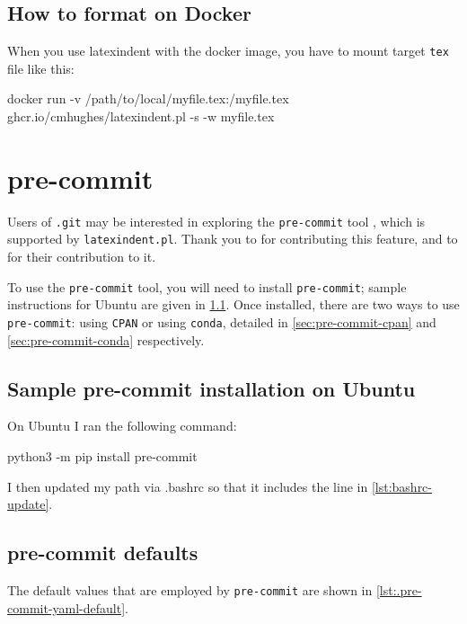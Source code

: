  \subsection{How to format on Docker}
   When you use latexindent with the docker image, you have to mount target \texttt{tex} file like this:
\begin{commandshell}
  docker run -v /path/to/local/myfile.tex:/myfile.tex ghcr.io/cmhughes/latexindent.pl -s -w myfile.tex
\end{commandshell}

\section{pre-commit}

  Users of \texttt{.git} may be interested  in exploring the \texttt{pre-commit} tool \cite{pre-commithome}, which is
  supported by \texttt{latexindent.pl}. Thank you to \cite{tdegeusprecommit} for
  contributing this feature, and to \cite{holzhausprecommit} for their contribution to it.

  To use the \texttt{pre-commit} tool, you will need to install \texttt{pre-commit}; sample
  instructions for Ubuntu are given in \cref{sec:pre-commit-ubuntu}. Once installed, there
  are two ways to use \texttt{pre-commit}: using \texttt{CPAN} or using \texttt{conda},
  detailed in \cref{sec:pre-commit-cpan} and \cref{sec:pre-commit-conda} respectively.

 \subsection{Sample pre-commit installation on Ubuntu}\label{sec:pre-commit-ubuntu}
  On Ubuntu I ran the following command:
  \begin{commandshell}
python3 -m pip install pre-commit
\end{commandshell}
  I then updated my path via .bashrc so that it includes the line in
  \cref{lst:bashrc-update}.

 \subsection{pre-commit defaults}
  The default values that are employed by \texttt{pre-commit} are shown in \cref{lst:.pre-commit-yaml-default}.

